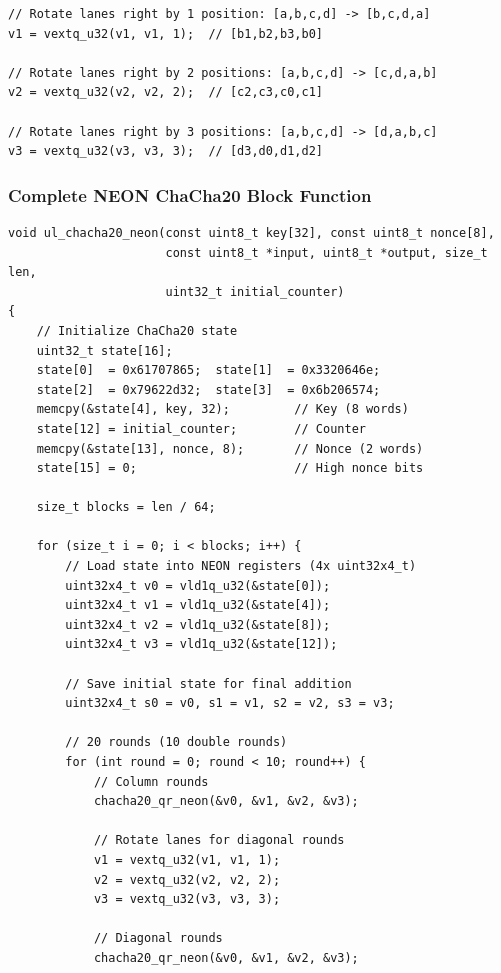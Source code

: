 \documentclass[11pt,a4paper]{article}
\begin{document}
\begin{lstlisting}[caption={NEON Lane Rotation for Diagonal Rounds}]
// Rotate lanes right by 1 position: [a,b,c,d] -> [b,c,d,a]
v1 = vextq_u32(v1, v1, 1);  // [b1,b2,b3,b0]

// Rotate lanes right by 2 positions: [a,b,c,d] -> [c,d,a,b]
v2 = vextq_u32(v2, v2, 2);  // [c2,c3,c0,c1]

// Rotate lanes right by 3 positions: [a,b,c,d] -> [d,a,b,c]
v3 = vextq_u32(v3, v3, 3);  // [d3,d0,d1,d2]
\end{lstlisting}

\subsubsection{Complete NEON ChaCha20 Block Function}

\begin{lstlisting}[caption={NEON ChaCha20 Block Processing}]
void ul_chacha20_neon(const uint8_t key[32], const uint8_t nonce[8],
                      const uint8_t *input, uint8_t *output, size_t len,
                      uint32_t initial_counter)
{
    // Initialize ChaCha20 state
    uint32_t state[16];
    state[0]  = 0x61707865;  state[1]  = 0x3320646e;
    state[2]  = 0x79622d32;  state[3]  = 0x6b206574;
    memcpy(&state[4], key, 32);         // Key (8 words)
    state[12] = initial_counter;        // Counter
    memcpy(&state[13], nonce, 8);       // Nonce (2 words)
    state[15] = 0;                      // High nonce bits

    size_t blocks = len / 64;

    for (size_t i = 0; i < blocks; i++) {
        // Load state into NEON registers (4x uint32x4_t)
        uint32x4_t v0 = vld1q_u32(&state[0]);
        uint32x4_t v1 = vld1q_u32(&state[4]);
        uint32x4_t v2 = vld1q_u32(&state[8]);
        uint32x4_t v3 = vld1q_u32(&state[12]);

        // Save initial state for final addition
        uint32x4_t s0 = v0, s1 = v1, s2 = v2, s3 = v3;

        // 20 rounds (10 double rounds)
        for (int round = 0; round < 10; round++) {
            // Column rounds
            chacha20_qr_neon(&v0, &v1, &v2, &v3);

            // Rotate lanes for diagonal rounds
            v1 = vextq_u32(v1, v1, 1);
            v2 = vextq_u32(v2, v2, 2);
            v3 = vextq_u32(v3, v3, 3);

            // Diagonal rounds
            chacha20_qr_neon(&v0, &v1, &v2, &v3);


\end{lstlisting}
\end{document}

